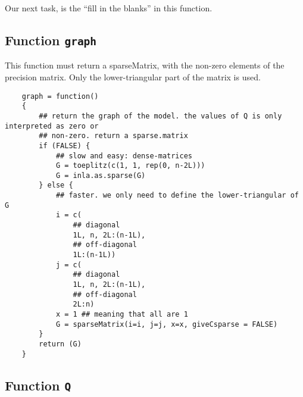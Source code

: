 \documentclass[a4paper,11pt]{article}
\begin{document}
Our next task, is the ``fill in the blanks'' in this function.

\subsection*{Function \texttt{graph}}

This function must return a sparseMatrix, with the non-zero elements
of the precision matrix. Only the lower-triangular part of the matrix
is used. 
{\small
\begin{verbatim}
    graph = function()
    {
        ## return the graph of the model. the values of Q is only interpreted as zero or
        ## non-zero. return a sparse.matrix
        if (FALSE) {
            ## slow and easy: dense-matrices
            G = toeplitz(c(1, 1, rep(0, n-2L)))
            G = inla.as.sparse(G)
        } else {
            ## faster. we only need to define the lower-triangular of G
            i = c(
                ## diagonal
                1L, n, 2L:(n-1L),
                ## off-diagonal
                1L:(n-1L))
            j = c(
                ## diagonal
                1L, n, 2L:(n-1L),
                ## off-diagonal
                2L:n)
            x = 1 ## meaning that all are 1
            G = sparseMatrix(i=i, j=j, x=x, giveCsparse = FALSE)
        }            
        return (G)
    }
\end{verbatim}
}

\subsection*{Function \texttt{Q}}
\end{document}
